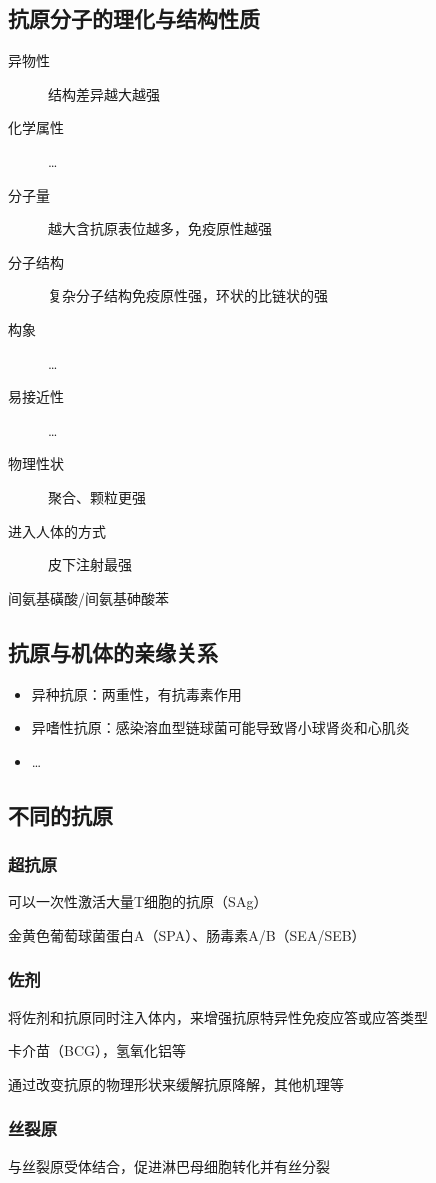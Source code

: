\subsection{抗原分子的理化与结构性质}%
\label{sub:抗原分子的理化与结构性质}
\begin{description}
    \item[异物性] 结构差异越大越强
    \item [化学属性] \ldots 
    \item [分子量]越大含抗原表位越多，免疫原性越强
    \item [分子结构]复杂分子结构免疫原性强，环状的比链状的强
    \item [构象] \ldots 
    \item [易接近性] \ldots 
    \item [物理性状]聚合、颗粒更强
    \item [进入人体的方式]皮下注射最强
\end{description}
\begin{eg}
    间氨基磺酸/间氨基砷酸苯
\end{eg}
\subsection{抗原与机体的亲缘关系}%
\label{sub:抗原与机体的亲缘关系}
\begin{itemize}
    \item 异种抗原：两重性，有抗毒素作用
    \item 异嗜性抗原：感染溶血型链球菌可能导致肾小球肾炎和心肌炎
    \item \ldots 
    
\end{itemize}
\subsection{不同的抗原}%
\label{sub:不同的抗原}
\subsubsection*{超抗原}%
\label{subsub*:超抗原}
\begin{defi}
    可以一次性激活大量T细胞的抗原（SAg）
\end{defi}
\begin{eg}
    金黄色葡萄球菌蛋白A（SPA）、肠毒素A/B（SEA/SEB）
\end{eg}
\subsubsection*{佐剂}%
\label{subsub*:佐剂}
\begin{defi}
    将佐剂和抗原同时注入体内，来增强抗原特异性免疫应答或应答类型
\end{defi}
\begin{eg}
    卡介苗（BCG），氢氧化铝等
\end{eg}
通过改变抗原的物理形状来缓解抗原降解，其他机理等
\subsubsection*{丝裂原}%
\label{subsub*:丝裂原}
\begin{defi}
与丝裂原受体结合，促进淋巴母细胞转化并有丝分裂
\end{defi}
